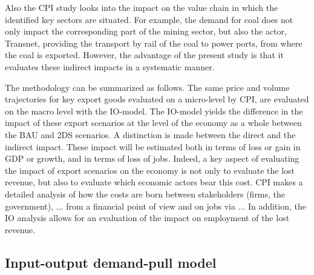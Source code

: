 \documentclass[12pt,english]{article}
\begin{document}
Also the CPI study looks into the impact on the value chain in which the identified key sectors are situated. For example, the demand for coal does not only impact the corresponding part of the mining sector, but also the actor, Transnet, providing the transport by rail of the coal to power ports, from where the coal is exported. However, the advantage of the present study is that it evaluates these indirect impacts in a systematic manner.

The methodology can be summarized as follows. The same price and volume trajectories for key export goods %
evaluated on a micro-level by CPI, are evaluated on the macro level with the IO-model. The IO-model yields the difference in the impact of these export scenarios at the level of the economy as a whole between the BAU and 2DS scenarios. A distinction is made between the direct and the indirect impact. %
These impact will be estimated both in terms of loss or gain in GDP or growth, and in terms of loss of jobs. Indeed, a key aspect of evaluating the impact of export scenarios on the economy is not only to evaluate the lost revenue, but also to evaluate which economic actors bear this cost. CPI makes a detailed analysis of how the costs are born between stakeholders (firms, the government), ... from a financial point of view and on jobs via ... In addition, the IO analysis allows for an evaluation of the impact on employment of the lost revenue. 



\clearpage

\subsection{Input-output demand-pull model}
\end{document}

